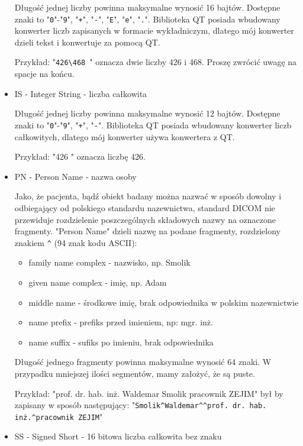 \begin{itemize}
    Długość jednej liczby powinna maksymalne wynosić 16 bajtów.
    Dostępne znaki to "\texttt{0}"-"\texttt{9}", "\texttt{+}", "\texttt{-}", "\texttt{E}", "\texttt{e}", "\texttt{.}".
    Biblioteka QT posiada wbudowany konwerter liczb zapisanych w formacie wykładniczym, dlatego mój konwerter dzieli tekst i konwertuje za pomocą QT.
    
    Przykład: "\texttt{426\textbackslash468 }" oznacza dwie liczby 426 i 468. Proszę zwrócić uwagę na spacje na końcu.

    \item IS - Integer String - liczba całkowita 

    Długość jednej liczby powinna maksymalne wynosić 12 bajtów.
    Dostępne znaki to "\texttt{0}"-"\texttt{9}", "\texttt{+}", "\texttt{-}".
    Biblioteka QT posiada wbudowany konwerter liczb całkowitych, dlatego mój konwerter używa konwertera z QT.
    
    Przykład: "426 " oznacza liczbę 426.

    \item PN - Person Name - nazwa osoby

    Jako, że pacjenta, bądź obiekt badany można nazwać w sposób dowolny i odbiegający od polskiego standardu nazewnictwa, standard DICOM nie przewiduje rozdzielenie poszczególnych składowych nazwy na oznaczone fragmenty.
    "Person Name" dzieli nazwę na podane fragmenty, rozdzielony znakiem \texttt{\^{}} (94 znak kodu ASCII):
    \begin{itemize}
        \item family name complex - nazwisko, np. Smolik
        \item given name complex - imię, np. Adam
        \item middle name - środkowe imię, brak odpowiednika w polskim nazewnictwie
        \item name prefix - prefiks przed imieniem, np: mgr. inż.
        \item name suffix - sufiks po imieniu, brak odpowiednika
    \end{itemize}
    Długość jednego fragmenty powinna maksymalne wynosić 64 znaki.
    W przypadku mniejszej ilości segmentów, mamy założyć, że są puste.
    
    Przykład: "prof. dr. hab. inż. Waldemar Smolik pracownik ZEJIM" był by zapisany w sposób następujący: "\texttt{Smolik\^{}Waldemar\^{}\^{}prof. dr. hab. inż.\^{}pracownik ZEJIM}"

    \item SS - Signed Short - 16 bitowa liczba całkowita bez znaku
    

\end{itemize}
